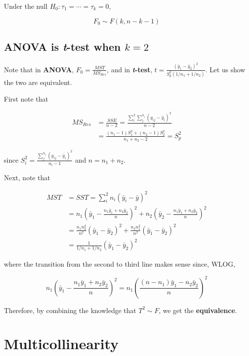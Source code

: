 \documentclass[12pt]{article}
\begin{document}
Under the null $H_0 : \tau_1 = \cdots = \tau_k = 0$, 

$$F_0 \sim F(k, n-k-1)$$


\subsection{ANOVA is \textit{t}-test when $k=2$}

Note that in \textbf{ANOVA}, $F_0 = \frac{MST}{MS_{Res}}$, and in \textbf{\textit{t}-test}, $t = \frac{(\bar{y}_1 - \bar{y}_2)^2} {S_p^2 (1/n_1 + 1/n_2)}$. Let us show the two are equivalent.

First note that 

$$
\begin{aligned}
MS_{Res} &= \frac{SSE}{n-2} = \frac{\sum_i^2 \sum_j^{n_i} (y_{ij} - \bar{y}_i)^2}{n-2} \\[8pt]
&= \frac{(n_1 - 1)S_1^2 + (n_2 - 1)S_2^2}{n_1 + n_2 - 2} = S_p^2
\end{aligned}
$$

since $S_i^2 = \frac{\sum_j^{n_i} (y_{ij} - \bar{y}_i)^2}{n_i - 1}$ and $n = n_1 + n_2$.

Next, note that 

$$
\begin{aligned}
MST &= SST = \sum_i^2 n_i (\bar{y}_i - \bar{y})^2 \\[8pt]
&= n_1 \left( \bar{y}_1 - \frac{n_1\bar{y}_1 + n_2 \bar{y}_2}{n} \right)^2 + n_2 \left( \bar{y}_2 - \frac{n_1\bar{y}_1 + n_2 \bar{y}_2}{n} \right)^2 \\[8pt]
&= \frac{n_1 n_2^2}{n^2} (\bar{y}_1 - \bar{y}_2)^2 + \frac{n_2 n_1^2}{n^2} (\bar{y}_1 - \bar{y}_2)^2 \\[8pt]
&= \frac{1}{1/n_1 + 1/n_2} (\bar{y}_1 - \bar{y}_2)^2
\end{aligned}
$$

where the transition from the second to third line makes sense since, WLOG,

$$
n_1 \left( \bar{y}_1 - \frac{n_1\bar{y}_1 + n_2 \bar{y}_2}{n} \right)^2 = n_1 \left( \frac{(n-n_1) \bar{y}_1 - n_2 \bar{y}_2}{n} \right)^2
$$


Therefore, by combining the knowledge that $T^2 \sim F$, we get the \textbf{equivalence}.



\pagebreak
\section*{Multicollinearity}
\setcounter{section}{0}
\bigskip
\end{document}
